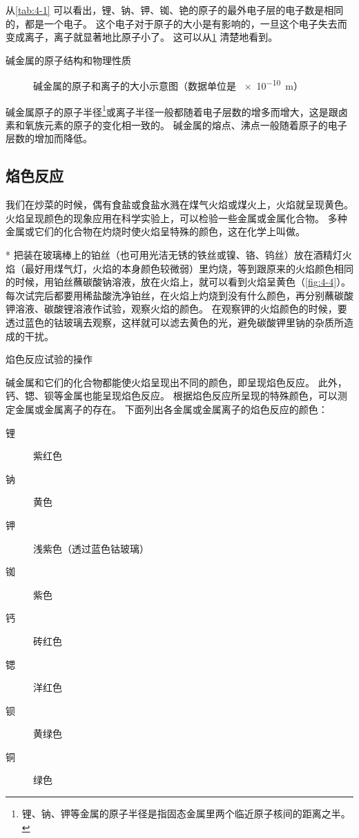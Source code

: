从\cref{tab:4-1} 可以看出，锂、钠、钾、铷、铯的原子的最外电子层的电子数是相同的，都是一个电子。
这个电子对于原子的大小是有影响的，一旦这个电子失去而变成离子，离子就显著地比原子小了。
这可以从\cref{fig:4-3} 清楚地看到。
\begin{table}
  \caption{碱金属的原子结构和物理性质}\label{tab:4-1}
\end{table}
\begin{figure}
  \caption{碱金属的原子和离子的大小示意图（数据单位是 \qty{e-10}{m}）}\label{fig:4-3}
\end{figure}

碱金属原子的原子半径\footnote{锂、钠、钾等金属的原子半径是指固态金属里两个临近原子核间的距离之半。}或离子半径一般都随着电子层数的增多而增大，这是跟卤素和氧族元素的原子的变化相一致的。
碱金属的熔点、沸点一般随着原子的电子层数的增加而降低。

\subsection{焰色反应}
我们在炒菜的时候，偶有食盐或食盐水溅在煤气火焰或煤火上，火焰就呈现黄色。
火焰呈现颜色的现象应用在科学实验上，可以检验一些金属或金属化合物。
多种金属或它们的化合物在灼烧时使火焰呈特殊的颜色，这在化学上叫做。
\begin{Experiment}*
把装在玻璃棒上的铂丝（也可用光洁无锈的铁丝或镍、铬、钨丝）放在酒精灯火焰（最好用煤气灯，火焰的本身颜色较微弱）里灼烧，等到跟原来的火焰颜色相同的时候，用铂丝蘸碳酸钠溶液，放在火焰上，就可以看到火焰呈黄色（\cref{fig:4-4}）。
每次试完后都要用稀盐酸洗净铂丝，在火焰上灼烧到没有什么颜色，再分别蘸碳酸钾溶液、碳酸锂溶液作试验，观察火焰的颜色。
在观察钾的火焰颜色的时候，要透过蓝色的钴玻璃去观察，这样就可以滤去黄色的光，避免碳酸钾里钠的杂质所造成的干扰。
  \tcblower
  \begin{figurehere}
    \caption{焰色反应试验的操作}\label{fig:4-4}
  \end{figurehere}
\end{Experiment}
碱金属和它们的化合物都能使火焰呈现出不同的颜色，即呈现焰色反应。
此外，钙、锶、钡等金属也能呈现焰色反应。
根据焰色反应所呈现的特殊颜色，可以测定金属或金属离子的存在。
下面列出各金属或金属离子的焰色反应的颜色：
\begin{description}
  \item[锂] 紫红色
  \item[钠] 黄色
  \item[钾] 浅紫色（透过蓝色钴玻璃）
  \item[铷] 紫色
  \item[钙] 砖红色
  \item[锶] 洋红色
  \item[钡] 黄绿色
  \item[铜] 绿色
\end{description}


